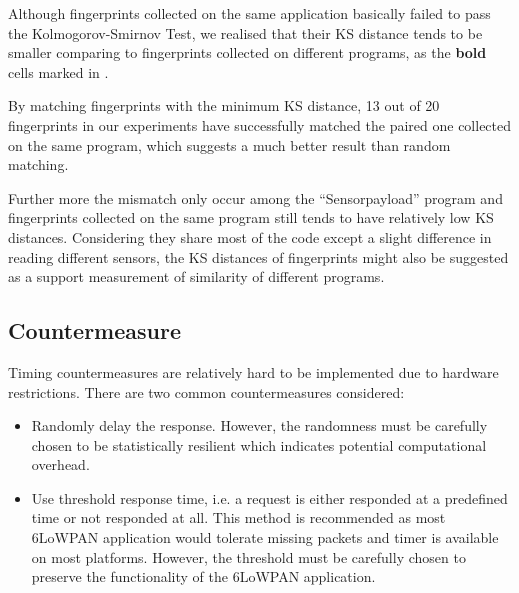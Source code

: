 Although fingerprints collected on the same application basically failed to pass the Kolmogorov-Smirnov Test, we realised that their KS distance tends to be smaller comparing to fingerprints collected on different programs, as the \textbf{bold} cells marked in . 

By matching fingerprints with the minimum KS distance, 13 out of 20 fingerprints in our experiments have successfully matched the paired one collected on the same program, which suggests a much better result than random matching.

Further more the mismatch only occur among the ``Sensorpayload'' program and fingerprints collected on the same program still tends to have relatively low KS distances. Considering they share most of the code except a slight difference in reading different sensors, the KS distances of fingerprints might also be suggested as a support measurement of similarity of different programs.

\subsection{Countermeasure}
Timing countermeasures are relatively hard to be implemented due to hardware restrictions. There are two common countermeasures considered:
\begin{itemize}
	\item Randomly delay the response. However, the randomness must be carefully chosen to be statistically resilient which indicates potential computational overhead.
	 
	\item Use threshold response time, i.e. a request is either responded at a predefined time or not responded at all. This method is recommended as most 6LoWPAN application would tolerate missing packets and timer is available on most platforms. However, the threshold must be carefully chosen to preserve the functionality of the 6LoWPAN application.
\end{itemize}
